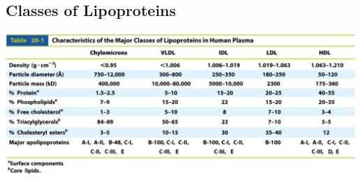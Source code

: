 \documentclass[10pt]{article}
\begin{document}
\subsection*{Classes of Lipoproteins}
\begin{center}
    \includegraphics*[width=\textwidth]{L2_19.png}
\end{center}
\end{document}
